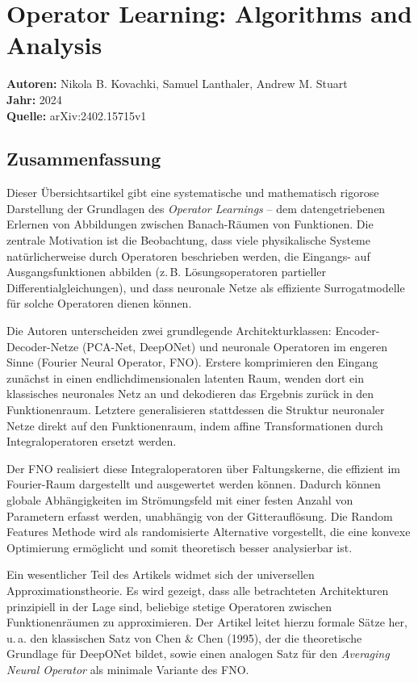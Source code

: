\documentclass[a4paper,12pt]{article}
\begin{document}
\section*{Operator Learning: Algorithms and Analysis}
\textbf{Autoren:} Nikola B. Kovachki, Samuel Lanthaler, Andrew M. Stuart \\
\textbf{Jahr:} 2024 \\
\textbf{Quelle:} arXiv:2402.15715v1

\subsection*{Zusammenfassung}

Dieser Übersichtsartikel gibt eine systematische und mathematisch rigorose Darstellung der Grundlagen des \textit{Operator Learnings} – dem datengetriebenen Erlernen von Abbildungen zwischen Banach-Räumen von Funktionen. Die zentrale Motivation ist die Beobachtung, dass viele physikalische Systeme natürlicherweise durch Operatoren beschrieben werden, die Eingangs- auf Ausgangsfunktionen abbilden (z.\,B. Lösungsoperatoren partieller Differentialgleichungen), und dass neuronale Netze als effiziente Surrogatmodelle für solche Operatoren dienen können.

Die Autoren unterscheiden zwei grundlegende Architekturklassen: Encoder-Decoder-Netze (PCA-Net, DeepONet) und neuronale Operatoren im engeren Sinne (Fourier Neural Operator, FNO). Erstere komprimieren den Eingang zunächst in einen endlichdimensionalen latenten Raum, wenden dort ein klassisches neuronales Netz an und dekodieren das Ergebnis zurück in den Funktionenraum. Letztere generalisieren stattdessen die Struktur neuronaler Netze direkt auf den Funktionenraum, indem affine Transformationen durch Integraloperatoren ersetzt werden.

Der FNO realisiert diese Integraloperatoren über Faltungskerne, die effizient im Fourier-Raum dargestellt und ausgewertet werden können. Dadurch können globale Abhängigkeiten im Strömungsfeld mit einer festen Anzahl von Parametern erfasst werden, unabhängig von der Gitterauflösung. Die Random Features Methode wird als randomisierte Alternative vorgestellt, die eine konvexe Optimierung ermöglicht und somit theoretisch besser analysierbar ist.

Ein wesentlicher Teil des Artikels widmet sich der universellen Approximationstheorie. Es wird gezeigt, dass alle betrachteten Architekturen prinzipiell in der Lage sind, beliebige stetige Operatoren zwischen Funktionenräumen zu approximieren. Der Artikel leitet hierzu formale Sätze her, u.\,a. den klassischen Satz von Chen \& Chen (1995), der die theoretische Grundlage für DeepONet bildet, sowie einen analogen Satz für den \textit{Averaging Neural Operator} als minimale Variante des FNO.
\end{document}
